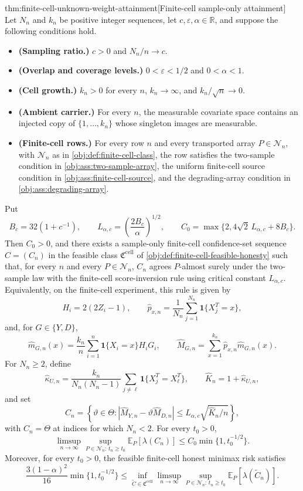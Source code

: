 \documentclass[11pt]{article}
\begin{document}
\begin{theoremv}{thm:finite-cell-unknown-weight-attainment}[Finite-cell sample-only attainment]
Let \(N_n\) and \(k_n\) be positive integer sequences, let \(c,\varepsilon,\alpha\in\mathbb R\), and suppose the following conditions hold.
\begin{itemize}
\item \textbf{(Sampling ratio.)} \(c>0\) and \(N_n/n\to c\).
\item \textbf{(Overlap and coverage levels.)} \(0<\varepsilon<1/2\) and \(0<\alpha<1\).
\item \textbf{(Cell growth.)} \(k_n>0\) for every \(n\), \(k_n\to\infty\), and \(k_n/\sqrt n\to0\).
\item \textbf{(Ambient carrier.)} For every \(n\), the measurable covariate space contains an injected copy of \(\{1,\ldots,k_n\}\) whose singleton images are measurable.
\item \textbf{(Finite-cell rows.)} For every row \(n\) and every transported array \(P\in\mathcal N_n\), with \(\mathcal N_n\) as in \cref{obj:def:finite-cell-class}, the row satisfies the two-sample condition in \cref{obj:ass:two-sample-array}, the uniform finite-cell source condition in \cref{obj:ass:finite-cell-source}, and the degrading-array condition in \cref{obj:ass:degrading-array}.
\end{itemize}
Put
\[
B_c=32(1+c^{-1}),\qquad
L_{\alpha,c}=\left(\frac{2B_c}{\alpha}\right)^{1/2},\qquad
C_0=\max\{2,4\sqrt2\,L_{\alpha,c}+8B_c\}.
\]
Then \(C_0>0\), and there exists a sample-only finite-cell confidence-set sequence \(C=(C_n)\) in the feasible class \(\mathfrak C^{\mathrm{cell}}\) of \cref{obj:def:finite-cell-feasible-honesty} such that, for every \(n\) and every \(P\in\mathcal N_n\), \(C_n\) agrees \(P\)-almost surely under the two-sample law with the finite-cell score-inversion rule using critical constant \(L_{\alpha,c}\). Equivalently, on the finite-cell experiment, this rule is given by
\[
H_i=2(2Z_i-1),\qquad
\widehat p_{x,n}=\frac1{N_n}\sum_{j=1}^{N_n}\mathbf 1\{X_j^T=x\},
\]
and, for \(G\in\{Y,D\}\),
\[
\widehat m_{G,n}(x)=\frac{k_n}{n}\sum_{i=1}^n
\mathbf 1\{X_i=x\}H_iG_i,\qquad
\widehat M_{G,n}=\sum_{x=1}^{k_n}\widehat p_{x,n}\widehat m_{G,n}(x).
\]
For \(N_n\ge2\), define
\[
\widehat\kappa_{U,n}
=\frac{k_n}{N_n(N_n-1)}
\sum_{j\ne\ell}\mathbf 1\{X_j^T=X_\ell^T\},\qquad
\widehat K_n=1+\widehat\kappa_{U,n},
\]
and set
\[
C_n=\left\{\vartheta\in\Theta:
|\widehat M_{Y,n}-\vartheta\widehat M_{D,n}|
\le L_{\alpha,c}\sqrt{\widehat K_n/n}\right\},
\]
with \(C_n=\Theta\) at indices for which \(N_n<2\). For every \(t_0>0\),
\[
\limsup_{n\to\infty}\sup_{P\in\mathcal N_n:\,t_n\ge t_0}
\mathbb E_P[\lambda(C_n)]
\le
C_0\min\{1,t_0^{-1/2}\}.
\]
Moreover, for every \(t_0>0\), the feasible finite-cell honest minimax risk satisfies
\[
\frac{3(1-\alpha)^2}{16}\min\{1,t_0^{-1/2}\}
\le
\inf_{\widetilde C\in\mathfrak C^{\mathrm{cell}}}
\limsup_{n\to\infty}\sup_{P\in\mathcal N_n:\,t_n\ge t_0}
\mathbb E_P[\lambda(\widetilde C_n)].
\]
\end{theoremv}
\end{document}

